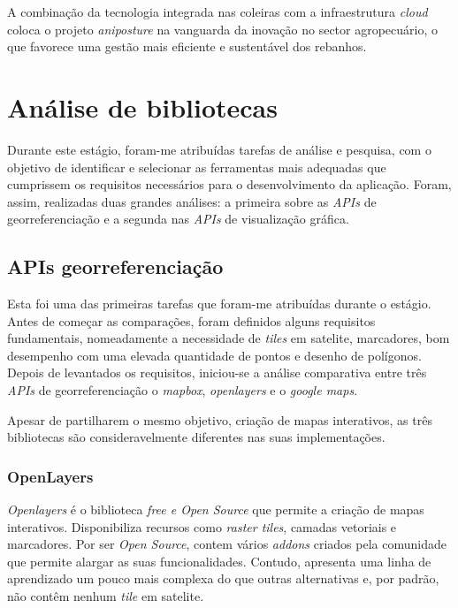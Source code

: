 A combinação da tecnologia integrada nas coleiras com a infraestrutura \textit{cloud} coloca o projeto \textit{aniposture} na vanguarda da inovação no sector agropecuário, o que favorece uma gestão mais eficiente e sustentável dos rebanhos.

\section{Análise de bibliotecas}\label{sec:analysis}
Durante este estágio, foram-me atribuídas tarefas de análise e pesquisa, com o objetivo de identificar e selecionar as ferramentas mais adequadas que cumprissem os requisitos necessários para o desenvolvimento da aplicação. Foram, assim, realizadas duas grandes análises: a primeira sobre as \textit{APIs} de georreferenciação e a segunda nas \textit{APIs} de visualização gráfica.

\subsection{APIs georreferenciação} %
Esta foi uma das primeiras tarefas que foram-me atribuídas durante o estágio. Antes de começar as comparações, foram definidos alguns requisitos fundamentais, nomeadamente a necessidade de \textit{tiles} em satelite, marcadores, bom desempenho com uma elevada quantidade de pontos e desenho de polígonos. Depois de levantados os requisitos, iniciou-se a análise comparativa entre três \textit{APIs} de georreferenciação o \textit{mapbox}, \textit{openlayers} e o \textit{google maps}.

Apesar de partilharem o mesmo objetivo, criação de mapas interativos, as três bibliotecas são consideravelmente diferentes nas suas implementações. 

\subsubsection{\textbf{OpenLayers}}\label{sec:sub_ol} 

\textit{Openlayers} é o biblioteca \textit{free e Open Source} que permite a criação de mapas interativos. Disponibiliza recursos como \textit{raster tiles}, camadas vetoriais e marcadores. Por ser \textit{Open Source}, contem vários \textit{addons} criados pela comunidade que permite alargar as suas funcionalidades. Contudo, apresenta uma linha de aprendizado um pouco mais complexa do que outras alternativas e, por padrão, não contêm  nenhum \textit{tile} em satelite. 

